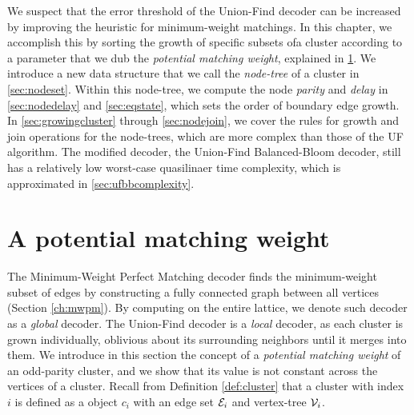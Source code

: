 We suspect that the error threshold of the Union-Find decoder can be increased by improving the heuristic for minimum-weight matchings. In this chapter, we accomplish this by sorting the growth of specific subsets ofa cluster according to a parameter that we dub the \emph{potential matching weight}, explained in \ref{sec:PMW}. We introduce a new data structure that we call the \emph{node-tree} of a cluster in \ref{sec:nodeset}. Within this node-tree, we compute the node \emph{parity} and \emph{delay} in \ref{sec:nodedelay} and \ref{sec:eqstate}, which sets the order of boundary edge growth. In \ref{sec:growingcluster} through \ref{sec:nodejoin}, we cover the rules for growth and join operations for the node-trees, which are more complex than those of the UF algorithm. The modified decoder, the Union-Find Balanced-Bloom decoder, still has a relatively low worst-case quasilinaer time complexity, which is approximated in \ref{sec:ufbbcomplexity}. 

\section{A potential matching weight}\label{sec:PMW}

The Minimum-Weight Perfect Matching decoder finds the minimum-weight subset of edges by constructing a fully connected graph between all vertices (Section \ref{ch:mwpm}). By computing on the entire lattice, we denote such decoder as a \emph{global} decoder. The Union-Find decoder is a \emph{local} decoder, as each cluster is grown individually, oblivious about its surrounding neighbors until it merges into them. We introduce in this section the concept of a \emph{potential matching weight} of an odd-parity cluster, and we show that its value is not constant across the vertices of a cluster. Recall from Definition \ref{def:cluster} that a cluster with index $i$ is defined as a object $c_i$ with an edge set $\mathcal{E}_i$ and vertex-tree $\mathcal{V}_i$.

